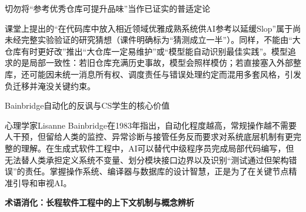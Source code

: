 \documentclass[UTF8,a4paper,11pt,fontset=fandol]{ctexart}
\begin{document}
\begin{warningbox}{切勿将“参考优秀仓库可提升品味”当作已证实的普适定论}

课堂上提出的“在代码库中放入相近领域优雅成熟系统供AI参考以延缓Slop”属于尚未经完整实验验证的研究猜想（课件明确标为“猜测成立一半”）。同样，不能由“大仓库有时更好改”推出“大仓库一定易维护”或“模型能自动识别最佳实践”。模型追求的是局部一致性：若旧仓库充满历史事故，模型会照样模仿；若直接塞入外部整库，还可能因未统一消息所有权、调度责任与错误处理约定而混用多套风格，引发负迁移并淹没关键约束。

\end{warningbox}

\begin{knowledgebox}{Bainbridge自动化的反讽与CS学生的核心价值}

心理学家Lisanne Bainbridge在1983年指出，自动化程度越高，常规操作越不需要人干预，但留给人类的监控、异常诊断与接管任务反而要求对系统底层机制有更完整的理解。在生成式软件工程中，AI可以替代中级程序员完成局部代码编写，但无法替人类承担定义系统不变量、划分模块接口边界以及识别“测试通过但架构错误”的责任。掌握操作系统、编译器与数据库的设计智慧，正是为了在关键节点精准引导和审视AI。

\end{knowledgebox}

\par{}\textbf{术语消化：长程软件工程中的上下文机制与概念辨析}
\end{document}
